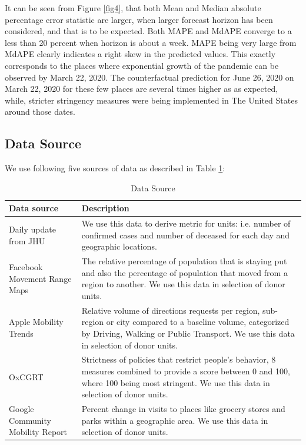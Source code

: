 \documentclass[preprint,authoryear,12pt]{elsarticle}
\begin{document}
    It can be seen from Figure \ref{fig4}, that both Mean and Median absolute percentage error statistic are larger, when larger forecast horizon has been considered, and that is to be expected. Both MAPE and MdAPE converge to a less than 20 percent when horizon is about a week. MAPE being very large from MdAPE clearly indicates a right skew in the predicted values. This exactly corresponds to the places where exponential growth of the pandemic can be observed by March 22, 2020. The counterfactual prediction for June 26, 2020 on March 22, 2020 for these few places are several times higher as as expected, while, stricter stringency measures were being implemented in The United States around those dates.
    
	\subsection{Data Source}
	We use following five sources of data as described in Table \ref{Table1}:
	
	\begin{table}
		\centering
		\begin{tabularx}{0.9\textwidth}[t]{p{}X}
			\hline
			\textbf{Data source} &  \textbf{Description}\\ [0.5ex]
			\hline\hline
			Daily update from JHU  \cite{DDG2020}  & We use this data to derive metric for units: i.e. number of confirmed cases and number of deceased for each day and geographic locations.\\ [1ex]
			\hline
			Facebook Movement Range Maps \cite{JM2020} & The relative percentage of population that is staying put and also the percentage of population that moved from a region to another. We use this data in selection of donor units.\\
			\hline
			Apple Mobility Trends\cite{Apple2020} & Relative volume of directions requests per region, sub-region or city compared to a baseline volume, categorized by Driving, Walking or Public Transport. We use this data in selection of donor units.\\
			\hline
			OxCGRT  \cite{HWP2020} &  Strictness of policies that restrict people’s behavior, 8 measures combined to provide a score between 0 and 100, where 100 being most stringent. We use this data in selection of donor units.\\
			\hline
			Google Community Mobility Report \cite{Goog2020} &  Percent change in visits to places like grocery stores and parks within a geographic area. We use this data in selection of donor units.\\ [1ex] 
			\hline
		\end{tabularx}
		\caption{Data Source}
		\label{Table1}
	\end{table}
	 
\end{document}
